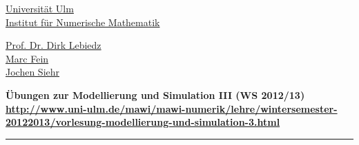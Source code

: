 
\begin{minipage}{0.49\textwidth}
 \begin{flushleft}
  \href{http://www.uni-ulm.de}{Universit\"at Ulm}\\
  \href{http://www.uni-ulm.de/mawi/mawi-numerik.html}{Institut f\"ur Numerische Mathematik}
 \end{flushleft}
\end{minipage}
\begin{minipage}{0.49\textwidth}
 \begin{flushright}
  \href{http://www.lebiedz.de}{Prof. Dr. Dirk Lebiedz}\\
  \href{http://www.lebiedz.de/gruppe/marcfein/index.html}{Marc Fein}\\
  \href{http://www.siehr.net}{Jochen Siehr}
 \end{flushright}
\end{minipage}
\bigskip
\begin{center}
\textbf{
\"Ubungen \theblatt{} 
zur Modellierung und Simulation III
(WS 2012/13)\\
\url{http://www.uni-ulm.de/mawi/mawi-numerik/lehre/wintersemester-20122013/vorlesung-modellierung-und-simulation-3.html}
}
\end{center}
\bigskip
\hrule
\bigskip

